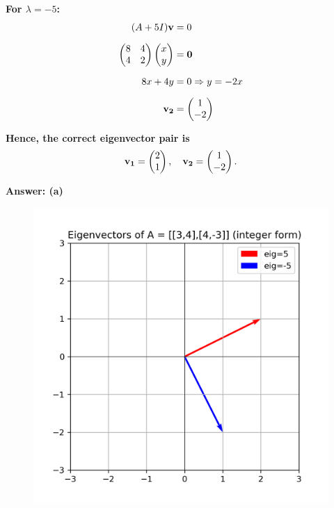 \documentclass[12pt]{article}
\begin{document}
\textbf{For $\lambda = -5$:}
\begin{align}
(A + 5I)\mathbf{v} &= 0 \\[6pt]
\begin{pmatrix}8 & 4 \\ 4 & 2\end{pmatrix}\begin{pmatrix}x \\ y\end{pmatrix} &= \mathbf{0} \\[6pt]
8x + 4y &= 0 \Rightarrow y = -2x \\[6pt]
\mathbf{v_2} &= \begin{pmatrix}1 \\ -2\end{pmatrix}
\end{align}

\textbf{Hence, the correct eigenvector pair is}
\begin{align}
\mathbf{v_1} = \begin{pmatrix}2 \\ 1\end{pmatrix}, \quad \mathbf{v_2} = \begin{pmatrix}1 \\ -2\end{pmatrix}.
\end{align}

\textbf{Answer: (a)}

\begin{figure}[H]
    \centering
    \includegraphics[width=0.9\columnwidth]{figs/eigenvectors_problem_adjusted.png}
    \caption{}
    \label{fig:placeholder}
\end{figure}
\end{document}
